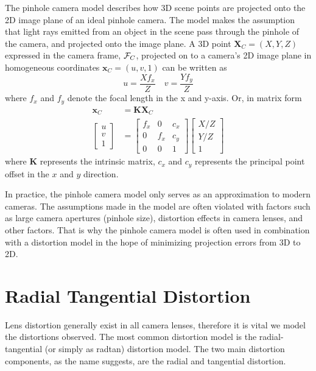 The pinhole camera model describes how 3D scene points are projected onto the
2D image plane of an ideal pinhole camera. The model makes the assumption that
light rays emitted from an object in the scene pass through the pinhole of the
camera, and projected onto the image plane. A 3D point $\mathbf{X}_{C} = (X, Y,
Z)$ expressed in the camera frame, $\mathcal{F}_{C}$, projected on to a camera's 2D
image plane in homogeneous coordinates $\mathbf{x}_{C} = (u, v, 1)$ can be
written as
%
\begin{equation}
  u = \dfrac{X f_{x}}{Z} \quad v = \dfrac{Y f_{y}}{Z}
\end{equation}
%
where $f_{x}$ and $f_{y}$ denote the focal length in the x and y-axis. Or, in
matrix form
%
\begin{align}
	\mathbf{x}_{C} &= \mathbf{K} \mathbf{X}_{C} \\
	\begin{bmatrix}
		u \\ v \\ 1
	\end{bmatrix} &=
	\begin{bmatrix}
		f_{x} & 0 & c_{x} \\
		0 & f_{x} & c_{y} \\
		0 & 0 & 1
	\end{bmatrix}
	\begin{bmatrix}
		X / Z \\ Y / Z \\ 1
	\end{bmatrix}
\end{align}
%
where $\mathbf{K}$ represents the intrinsic matrix, $c_{x}$ and $c_{y}$
represents the principal point offset in the $x$ and $y$ direction.

In practice, the pinhole camera model only serves as an approximation to modern
cameras. The assumptions made in the model are often violated with factors such
as large camera apertures (pinhole size), distortion effects in camera lenses,
and other factors. That is why the pinhole camera model is often used in
combination with a distortion model in the hope of minimizing projection errors
from 3D to 2D.



\section{Radial Tangential Distortion}

Lens distortion generally exist in all camera lenses, therefore it is vital we
model the distortions observed. The most common distortion model is the
radial-tangential (or simply as radtan) distortion model. The two main
distortion components, as the name suggests, are the radial and tangential
distortion.

